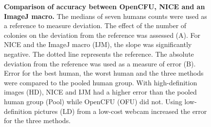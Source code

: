 \documentclass[10pt]{article}
\newcommand{\n}{seven}
\newcommand{\IJM}{IJM}
\begin{document}
\newpage{}




\begin{figure}[!ht]
\begin{center}


\end{center}

\caption{{\bf Comparison of accuracy between OpenCFU, NICE\cite{clarke_lowcost_2010} and  an ImageJ macro\cite{cai_optimized_2011}.} 
The medians of \n{} humans counts were used as a reference to measure deviation. The effect of
the number of colonies on the deviation from the reference was assessed (A). For NICE and the ImageJ macro (\IJM), the
slope was significantly negative. The dotted line represents the reference.
The absolute deviation from the reference was used as a measure of error (B). Error
for the best human, the worst human and the three methods were compared to the
pooled human group. With high-definition images (HD), NICE and \IJM{} had a higher error than the pooled human
group (Pool) while OpenCFU (OFU) did not. Using low-definition pictures (LD) from a low-cost webcam increased the error for the three methods.}
\label{figAccu}
\end{figure}


\newpage{}
\end{document}
